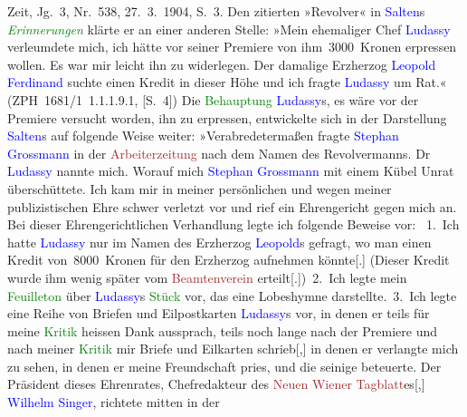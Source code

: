 {{{{{                        Zeit}}, Jg. 3, Nr. 538, 27. 3. 1904,
                     S. 3. Den zitierten »Revolver« in \textcolor{blue}{Salten}s \emph{\textcolor{green}{Erinnerungen}}
                  klärte er an einer anderen Stelle: »Mein ehemaliger Chef \textcolor{blue}{Ludassy} verleumdete mich, ich hätte vor seiner Premiere
                     von ihm 3000 Kronen erpressen wollen. Es war mir leicht ihn zu widerlegen. Der
                     damalige Erzherzog \textcolor{blue}{Leopold Ferdinand}
                     suchte einen Kredit in dieser Höhe und ich fragte \textcolor{blue}{Ludassy} um Rat.« (ZPH 1681/1 1.1.1.9.1,
                     [S. 4]) Die \textcolor{green}{Behauptung}{ }\textcolor{blue}{Ludassy}s, es wäre vor der Premiere versucht
                  worden, ihn zu erpressen, entwickelte sich in der Darstellung \textcolor{blue}{Salten}s auf folgende Weise weiter:
                     »Verabredetermaßen fragte \textcolor{blue}{Stephan
                        Grossmann} in der \textcolor{brown}{Arbeiterzeitung}
                     nach dem Namen des Revolvermanns. Dr \textcolor{blue}{Ludassy} nannte mich. Worauf mich \textcolor{blue}{Stephan Grossmann} mit einem Kübel Unrat überschüttete. Ich kam mir in
                     meiner persönlichen und wegen meiner publizistischen Ehre schwer verletzt vor
                     und rief ein Ehrengericht gegen mich an. Bei dieser Ehrengerichtlichen
                     Verhandlung legte ich folgende Beweise vor:  1. Ich hatte \textcolor{blue}{Ludassy} nur im Namen des Erzherzog \textcolor{blue}{Leopold}s gefragt, wo man einen Kredit von 8000 Kronen
                     für den Erzherzog aufnehmen könnte{[}.{]} (Dieser Kredit wurde
                     ihm wenig später vom \textcolor{brown}{Beamtenverein}
                        erteilt{[}.{]}) 2. Ich legte mein \textcolor{green}{Feuilleton} über \textcolor{blue}{Ludassy}s \textcolor{green}{Stück} vor, das eine Lobeshymne darstellte. 3. Ich
                     legte eine Reihe von Briefen und Eilpostkarten \textcolor{blue}{Ludassy}s vor, in denen er teils für meine \textcolor{green}{Kritik} heissen Dank
                     aussprach, teils noch lange nach der Premiere und nach meiner \textcolor{green}{Kritik} mir Briefe und Eilkarten
                        schrieb{[},{]} in denen er verlangte mich zu sehen, in denen
                     er meine Freundschaft pries, und die seinige beteuerte. Der Präsident dieses
                     Ehrenrates, Chefredakteur des \textcolor{brown}{Neuen Wiener
                        Tagblatt}es{[},{]}{ }\textcolor{blue}{Wilhelm Singer}, richtete mitten in der
}}}
